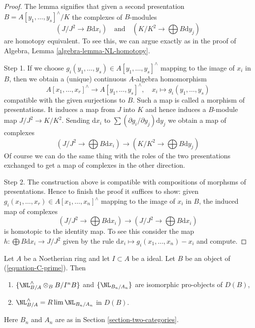 \begin{proof}
The lemma signifies that given a second presentation
$B = A[y_1, \ldots, y_s]^\wedge / K$ the complexes of $B$-modules
$$
(J/J^2 \to B\text{d}x_i)
\quad\text{and}\quad
(K/K^2 \to \bigoplus B\text{d}y_j)
$$
are homotopy equivalent. To see this, we can argue exactly as in
the proof of Algebra, Lemma \ref{algebra-lemma-NL-homotopy}.

\medskip\noindent
Step 1. If we choose $g_i(y_1, \ldots, y_s) \in A[y_1, \ldots, y_s]^\wedge$
mapping to the image of $x_i$ in $B$, then we obtain a (unique) continuous
$A$-algebra homomorphism
$$
A[x_1, \ldots, x_r]^\wedge \to A[y_1, \ldots, y_s]^\wedge,\quad
x_i \mapsto g_i(y_1, \ldots, y_s)
$$
compatible with the given surjections to $B$. Such a map is called
a morphism of presentations. It induces a map from $J$ into $K$
and hence induces a $B$-module map $J/J^2 \to K/K^2$. Sending
$\text{d}x_i$ to $\sum (\partial g_i/\partial y_j)\text{d}y_j$
we obtain a map of complexes
$$
(J/J^2 \to \bigoplus B\text{d}x_i)
\longrightarrow
(K/K^2 \to \bigoplus B\text{d}y_j)
$$
Of course we can do the same thing with the roles of the two presentations
exchanged to get a map of complexes in the other direction.

\medskip\noindent
Step 2. The construction above is compatible with compositions of morphsms
of presentations. Hence to finish the proof it suffices to show: given
$g_i(x_1, \ldots, x_r) \in A[x_1, \ldots, x_n]^\wedge$
mapping to the image of $x_i$ in $B$, the induced map of complexes
$$
(J/J^2 \to \bigoplus B\text{d}x_i)
\longrightarrow
(J/J^2 \to \bigoplus B\text{d}x_i)
$$
is homotopic to the identity map. To see this consider the map
$h : \bigoplus B \text{d}x_i \to J/J^2$ given by the rule
$\text{d}x_i \mapsto g_i(x_1, \ldots, x_n) - x_i$ and compute.
\end{proof}

\begin{lemma}
\label{lemma-NL-is-limit}
Let $A$ be a Noetherian ring and let $I \subset A$ be a ideal.
Let $B$ be an object of (\ref{equation-C-prime}). Then
\begin{enumerate}
\item $\{\NL^\wedge_{B/A} \otimes_B B/I^nB\}$
and $\{\NL_{B_n/A_n}\}$ are isomorphic pro-objects of $D(B)$,
\item $\NL^\wedge_{B/A} = R\lim \NL_{B_n/A_n}$ in $D(B)$.
\end{enumerate}
Here $B_n$ and $A_n$ are as in Section \ref{section-two-categories}.
\end{lemma}

